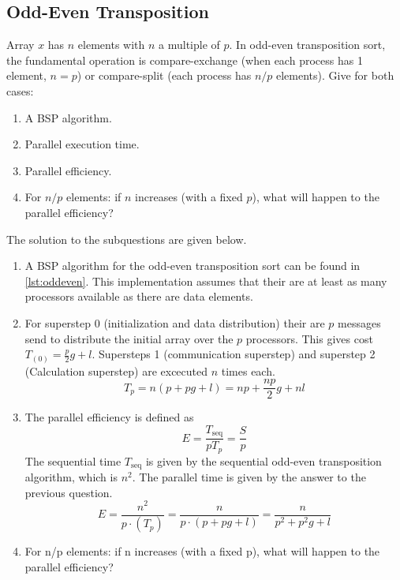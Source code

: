 \documentclass[../main.tex]{subfiles}
\begin{document}
\subsection{Odd-Even Transposition}
\begin{question}
Array $x$ has $n$ elements with $n$ a multiple of $p$. In odd-even transposition sort, the fundamental operation is compare-exchange (when each process has 1 element, $n = p$) or compare-split (each process has $n/p$ elements). Give for both cases:
\begin{enumerate}
	\item A BSP algorithm.
	\item Parallel execution time.
	\item Parallel efficiency.
	\item For $n/p$ elements: if $n$ increases (with a fixed $p$), what will happen to the parallel efficiency?
\end{enumerate}

\end{question}
\begin{solution} The solution to the subquestions are given below.
\begin{enumerate}
	\item A BSP algorithm for the odd-even transposition sort can be found in \autoref{lst:oddeven}. This implementation assumes that their are at least as many processors available as there are data elements.
		
	\item For superstep 0 (initialization and data distribution) their are $p$ messages send to distribute the initial array over the $p$ processors. This gives cost $T_{(0)} = \frac{p}{2}g + l$. Supersteps 1 (communication superstep) and superstep 2 (Calculation superstep) are excecuted $n$ times each.
	\begin{equation}
		T_p = n(p + pg + l) = np + \frac{np}{2}g + nl
	\end{equation}
	\item The parallel efficiency is defined as
	\begin{equation}
		E = \frac{T_\text{seq}}{p T_p} = \frac{S}{p}
	\end{equation}
	The sequential time $T_\text{seq}$ is given by the sequential odd-even transposition algorithm, which is $n^2$. The parallel time is given by the answer to the previous question.
	\begin{equation}
		E = \frac{n^2}{p \cdot (T_p)} = \frac{n}{p \cdot (p + pg + l)} = \frac{n}{p^2 + p^2g + l}
	\end{equation}
	\item For n/p elements: if n increases (with a fixed p), what will happen to the parallel efficiency?
\end{enumerate}
\end{solution}
\end{document}
